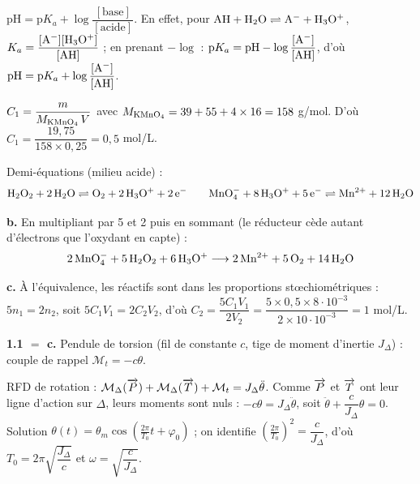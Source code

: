 \documentclass[11pt]{article}
\begin{document}
$\text{pH} = \text{p}K_a + \log\dfrac{[\text{base}]}{[\text{acide}]}$. En effet, pour $\mathrm{AH + H_2O \rightleftharpoons A^- + H_3O^+}$, $K_a = \dfrac{[\mathrm{A^-}][\mathrm{H_3O^+}]}{[\mathrm{AH}]}$ ; en prenant $-\log$ : $\text{p}K_a = \text{pH} - \log\dfrac{[\mathrm{A^-}]}{[\mathrm{AH}]}$, d'où $\text{pH} = \text{p}K_a + \log\dfrac{[\mathrm{A^-}]}{[\mathrm{AH}]}$.


 $C_1 = \dfrac{m}{M_{\mathrm{KMnO_4}}\,V}$ avec $M_{\mathrm{KMnO_4}} = 39 + 55 + 4\times 16 = 158$ g/mol. D'où $C_1 = \dfrac{19{,}75}{158\times 0{,}25} = 0{,}5$ mol/L.

 Demi-équations (milieu acide) :
\[ \mathrm{H_2O_2 + 2\,H_2O \rightleftharpoons O_2 + 2\,H_3O^+ + 2\,e^-} \qquad \mathrm{MnO_4^- + 8\,H_3O^+ + 5\,e^- \rightleftharpoons Mn^{2+} + 12\,H_2O} \]

\textbf{b.} En multipliant par 5 et 2 puis en sommant (le réducteur  cède autant d'électrons que l'oxydant  en capte) :
\[ \mathrm{2\,MnO_4^- + 5\,H_2O_2 + 6\,H_3O^+ \longrightarrow 2\,Mn^{2+} + 5\,O_2 + 14\,H_2O} \]

\textbf{c.} À l'équivalence, les réactifs sont dans les proportions stœchiométriques : $5n_1 = 2n_2$, soit $5C_1V_1 = 2C_2V_2$, d'où $C_2 = \dfrac{5C_1V_1}{2V_2} = \dfrac{5\times 0{,}5\times 8\cdot10^{-3}}{2\times 10\cdot10^{-3}} = 1$ mol/L.


\textbf{1.1 $= $ c.} Pendule de torsion (fil de constante $c$, tige de moment d'inertie $J_\Delta$) : couple de rappel $\mathcal{M}_t = -c\theta$.
\begin{center}
\end{center}
RFD de rotation : $\mathcal{M}_\Delta(\overrightarrow{P}) + \mathcal{M}_\Delta(\overrightarrow{T}) + \mathcal{M}_t = J_\Delta\ddot{\theta}$. Comme $\overrightarrow{P}$ et $\overrightarrow{T}$ ont leur ligne d'action sur $\Delta$, leurs moments sont nuls : $-c\theta = J_\Delta\ddot{\theta}$, soit $\ddot{\theta} + \dfrac{c}{J_\Delta}\theta = 0$. Solution $\theta(t) = \theta_m\cos\left(\frac{2\pi}{T_0}t + \varphi_0\right)$ ; on identifie $\left(\frac{2\pi}{T_0}\right)^2 = \dfrac{c}{J_\Delta}$, d'où $T_0 = 2\pi\sqrt{\dfrac{J_\Delta}{c}}$ et $\omega = \sqrt{\dfrac{c}{J_\Delta}}$.
\end{document}

